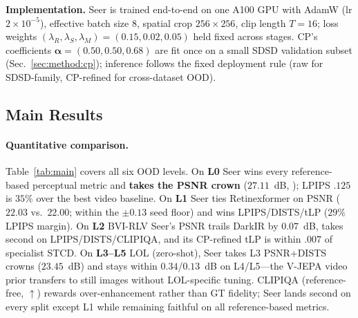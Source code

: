\noindent\textbf{Implementation.} Seer is trained end-to-end on one A100 GPU with AdamW (lr $2\!\times\!10^{-5}$), effective batch size 8, spatial crop $256{\times}256$, clip length $T{=}16$; loss weights $(\lambda_{R},\lambda_{S},\lambda_{M}){=}(0.15,0.02,0.05)$ held fixed across stages. CP's coefficients $\boldsymbol{\alpha}{=}(0.50,0.50,0.68)$ are fit once on a small SDSD validation subset (Sec.~\ref{sec:method:cp}); inference follows the fixed deployment rule (raw for SDSD-family, CP-refined for cross-dataset OOD).

\subsection{Main Results}\label{sec:experiments:main}

\paragraph{Quantitative comparison.} Table~\ref{tab:main} covers all six OOD levels. On \textbf{L0} Seer wins every reference-based perceptual metric and \textbf{takes the PSNR crown} ($27.11$~dB, ); LPIPS $.125$ is $35\%$ over the best video baseline. On \textbf{L1} Seer ties Retinexformer on PSNR ($22.03$ vs.\ $22.00$; within the $\pm 0.13$ seed floor) and wins LPIPS/DISTS/tLP ($29\%$ LPIPS margin). On \textbf{L2} BVI-RLV Seer's PSNR trails DarkIR by $0.07$~dB, takes second on LPIPS/DISTS/CLIPIQA, and its CP-refined tLP is within $.007$ of specialist STCD. On \textbf{L3--L5} LOL (zero-shot), Seer takes L3 PSNR+DISTS crowns ($23.45$~dB) and stays within $0.34$/$0.13$~dB on L4/L5---the V-JEPA video prior transfers to still images without LOL-specific tuning. CLIPIQA (reference-free, $\uparrow$) rewards over-enhancement rather than GT fidelity; Seer lands second on every split except L1 while remaining faithful on all reference-based metrics.

